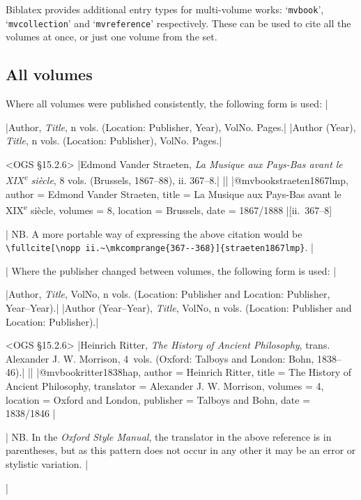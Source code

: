 \documentclass[extrafontsizes,11pt,a4paper,oneside]{memoir}
\newcommand*{\lit}[1]{\textsf{#1}}
\newcommand*{\code}[1]{`\texttt{#1}'}
\begin{document}
Biblatex provides additional entry types for multi-volume works: \code{mvbook}, \code{mvcollection} and \code{mvreference} respectively. These can be used to cite all the volumes at once, or just one volume from the set.

\subsection{All volumes}

Where all volumes were published consistently, the following form is used:
|

\specs
|Author, \emph{Title}, n \lit{vols.} (Location: Publisher, Year), VolNo. Pages.|%
|Author (Year), \emph{Title}, n \lit{vols.} (Location: Publisher), VolNo. Pages.|

\bibexample<OGS \S15.2.6>
|Edmond Vander Straeten, \emph{La Musique aux Pays-Bas avant le XIX\textsuperscript{e} siècle}, 8 vols. (Brussels, 1867--88), ii. 367--8.|
||%
|@mvbook{straeten1867lmp,
    author = {Edmond {Vander Straeten}},
    title = {La Musique aux Pays-Bas avant le XIX\textsuperscript{e} siècle},
    volumes = {8},
    location = {Brussels},
    date = {1867/1888}
}|[ii.~367--8]

\todoc[oxnotes]|
NB. A more portable way of expressing the above citation would be\\
\lstinline!\fullcite[\nopp ii.~\mkcomprange{367--368}]{straeten1867lmp}!.
|

\todoc|
Where the publisher changed between volumes, the following form is used:
|

\specs
|Author, \emph{Title}, VolNo, n \lit{vols.} (Location: Publisher and Location: Publisher, Year–Year).|%
|Author (Year–Year), \emph{Title}, VolNo, n \lit{vols.} (Location: Publisher and Location: Publisher).|

\bibexample<OGS \S15.2.6>
|Heinrich Ritter, \emph{The History of Ancient Philosophy}, trans. Alexander J. W. Morrison, 4~vols. (Oxford: Talboys and London: Bohn, 1838--46).|%
||%
|@mvbook{ritter1838hap,
  author = {Heinrich Ritter},
  title = {The History of Ancient Philosophy},
  translator = {Alexander J. W. Morrison},
  volumes = {4},
  location = {Oxford and London},
  publisher = {Talboys and Bohn},
  date = {1838/1846}
}|

\todoc[oxnotes]|
NB. In the \emph{Oxford Style Manual}, the translator in the above reference is in parentheses,
but as this pattern does not occur in any other it may be an error or stylistic variation.
|

\todoc|
\end{document}
